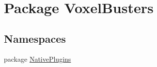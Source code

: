 \hypertarget{namespace_voxel_busters}{}\section{Package Voxel\+Busters}
\label{namespace_voxel_busters}
\subsection*{Namespaces}
\begin{DoxyCompactItemize}
\item 
package \hyperlink{namespace_voxel_busters_1_1_native_plugins}{Native\+Plugins}
\end{DoxyCompactItemize}
